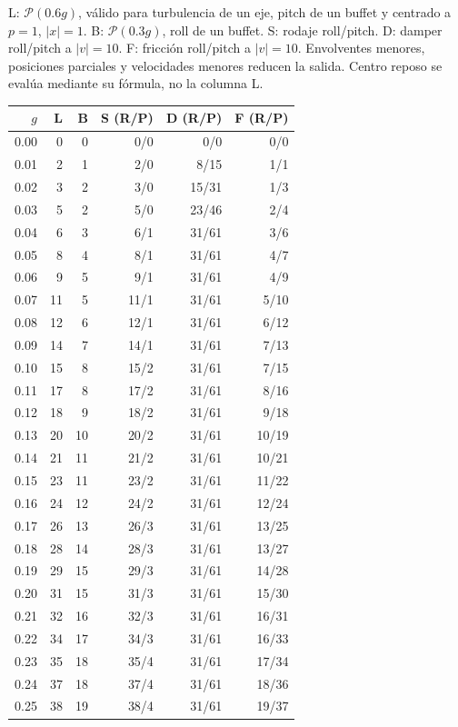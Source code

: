 \documentclass[11pt,a4paper]{article}
\begin{document}
L: $\mathcal P(0.6g)$, válido para turbulencia de un eje, pitch de un buffet y centrado a $p=1$, $|x|=1$. B: $\mathcal P(0.3g)$, roll de un buffet. S: rodaje roll/pitch. D: damper roll/pitch a $|v|=10$. F: fricción roll/pitch a $|v|=10$. Envolventes menores, posiciones parciales y velocidades menores reducen la salida. Centro reposo se evalúa mediante su fórmula, no la columna L.
\small
\begin{longtable}{rrrrrr}
\toprule $g$ & L & B & S (R/P) & D (R/P) & F (R/P)\\\midrule\endhead
0.00 & 0 & 0 & 0/0 & 0/0 & 0/0 \\
0.01 & 2 & 1 & 2/0 & 8/15 & 1/1 \\
0.02 & 3 & 2 & 3/0 & 15/31 & 1/3 \\
0.03 & 5 & 2 & 5/0 & 23/46 & 2/4 \\
0.04 & 6 & 3 & 6/1 & 31/61 & 3/6 \\
0.05 & 8 & 4 & 8/1 & 31/61 & 4/7 \\
0.06 & 9 & 5 & 9/1 & 31/61 & 4/9 \\
0.07 & 11 & 5 & 11/1 & 31/61 & 5/10 \\
0.08 & 12 & 6 & 12/1 & 31/61 & 6/12 \\
0.09 & 14 & 7 & 14/1 & 31/61 & 7/13 \\
0.10 & 15 & 8 & 15/2 & 31/61 & 7/15 \\
0.11 & 17 & 8 & 17/2 & 31/61 & 8/16 \\
0.12 & 18 & 9 & 18/2 & 31/61 & 9/18 \\
0.13 & 20 & 10 & 20/2 & 31/61 & 10/19 \\
0.14 & 21 & 11 & 21/2 & 31/61 & 10/21 \\
0.15 & 23 & 11 & 23/2 & 31/61 & 11/22 \\
0.16 & 24 & 12 & 24/2 & 31/61 & 12/24 \\
0.17 & 26 & 13 & 26/3 & 31/61 & 13/25 \\
0.18 & 28 & 14 & 28/3 & 31/61 & 13/27 \\
0.19 & 29 & 15 & 29/3 & 31/61 & 14/28 \\
0.20 & 31 & 15 & 31/3 & 31/61 & 15/30 \\
0.21 & 32 & 16 & 32/3 & 31/61 & 16/31 \\
0.22 & 34 & 17 & 34/3 & 31/61 & 16/33 \\
0.23 & 35 & 18 & 35/4 & 31/61 & 17/34 \\
0.24 & 37 & 18 & 37/4 & 31/61 & 18/36 \\
0.25 & 38 & 19 & 38/4 & 31/61 & 19/37 \\

\end{longtable}
\end{document}
